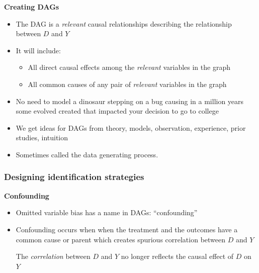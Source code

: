 \documentclass[notes=show]{beamer}
\begin{document}
\begin{frame}[plain]
\begin{center}
\textbf{Creating DAGs}
\end{center}

\begin{itemize}
		\item The DAG is a \emph{relevant} causal relationships describing the relationship between $D$ and $Y$
		\item It will include:
		\begin{itemize}
			\item All direct causal effects among the \emph{relevant} variables in the graph
			\item All common causes of any pair of \emph{relevant} variables in the graph
		\end{itemize}
		\item No need to model a dinosaur stepping on a bug causing in a million years some evolved created that impacted your decision to go to college
		\item We get ideas for DAGs from theory, models, observation, experience, prior studies, intuition
		\item Sometimes called the data generating process.
\end{itemize}

\end{frame}



\subsubsection{Designing identification strategies}

\begin{frame}[plain]
	\begin{center}
	\textbf{Confounding}
	\end{center}

	\begin{itemize}
		\item Omitted variable bias has a name in DAGs: ``confounding''
		\item Confounding occurs when when the treatment and the outcomes have a common cause or parent which creates spurious correlation between $D$ and $Y$
		
		\begin{center}
		\end{center}
		
		The \emph{correlation} between $D$ and $Y$ no longer reflects the causal effect of $D$ on $Y$
	\end{itemize}
\end{frame}
\end{document}
